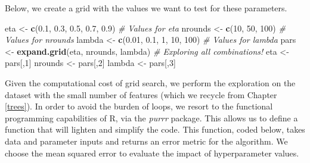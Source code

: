 \documentclass[]{krantz}
\makeatletter
\newenvironment{Shaded}{\begin{snugshade}}{\end{snugshade}}
\newcommand{\CommentTok}[1]{\textcolor[rgb]{0.37,0.37,0.37}{\textit{#1}}}
\newcommand{\DecValTok}[1]{\textcolor[rgb]{0.06,0.06,0.06}{#1}}
\newcommand{\FloatTok}[1]{\textcolor[rgb]{0.06,0.06,0.06}{#1}}
\newcommand{\KeywordTok}[1]{\textcolor[rgb]{0.27,0.27,0.27}{\textbf{#1}}}
\newcommand{\NormalTok}[1]{#1}
\newcommand{\StringTok}[1]{\textcolor[rgb]{0.5,0.5,0.5}{#1}}
\newenvironment{kframe}{%
\medskip{}
\setlength{\fboxsep}{.8em}
 \def\at@end@of@kframe{}%
 \ifinner\ifhmode%
  \def\at@end@of@kframe{\end{minipage}}%
  \begin{minipage}{\columnwidth}%
 \fi\fi%
 \def\FrameCommand##1{\hskip\@totalleftmargin \hskip-\fboxsep
 \colorbox{shadecolor}{##1}\hskip-\fboxsep
     \hskip-\linewidth \hskip-\@totalleftmargin \hskip\columnwidth}%
 \MakeFramed {\advance\hsize-\width
   \@totalleftmargin\z@ \linewidth\hsize
   \@setminipage}}%
 {\par\unskip\endMakeFramed%
 \at@end@of@kframe}
\renewenvironment{Shaded}{\begin{kframe}}{\end{kframe}}
\theoremstyle{definition}
\theoremstyle{definition}
\theoremstyle{definition}
\theoremstyle{remark}
\makeatother
\begin{document}
Below, we create a grid with the values we want to test for these
parameters.

\footnotesize

\begin{Shaded}
\begin{Highlighting}[]
\NormalTok{eta <-}\StringTok{ }\KeywordTok{c}\NormalTok{(}\FloatTok{0.1}\NormalTok{, }\FloatTok{0.3}\NormalTok{, }\FloatTok{0.5}\NormalTok{, }\FloatTok{0.7}\NormalTok{, }\FloatTok{0.9}\NormalTok{)         }\CommentTok{# Values for eta}
\NormalTok{nrounds <-}\StringTok{ }\KeywordTok{c}\NormalTok{(}\DecValTok{10}\NormalTok{, }\DecValTok{50}\NormalTok{, }\DecValTok{100}\NormalTok{)                 }\CommentTok{# Values for nrounds}
\NormalTok{lambda <-}\StringTok{ }\KeywordTok{c}\NormalTok{(}\FloatTok{0.01}\NormalTok{, }\FloatTok{0.1}\NormalTok{, }\DecValTok{1}\NormalTok{, }\DecValTok{10}\NormalTok{, }\DecValTok{100}\NormalTok{)        }\CommentTok{# Values for lambda}
\NormalTok{pars <-}\StringTok{ }\KeywordTok{expand.grid}\NormalTok{(eta, nrounds, lambda) }\CommentTok{# Exploring all combinations!}
\NormalTok{eta <-}\StringTok{ }\NormalTok{pars[,}\DecValTok{1}\NormalTok{]}
\NormalTok{nrounds <-}\StringTok{ }\NormalTok{pars[,}\DecValTok{2}\NormalTok{]}
\NormalTok{lambda <-}\StringTok{ }\NormalTok{pars[,}\DecValTok{3}\NormalTok{]}
\end{Highlighting}
\end{Shaded}

\normalsize

Given the computational cost of grid search, we perform the exploration
on the dataset with the small number of features (which we recycle from
Chapter \ref{trees}). In order to avoid the burden of loops, we resort
to the functional programming capabilities of R, via the \emph{purrr}
package. This allows us to define a function that will lighten and
simplify the code. This function, coded below, takes data and parameter
inputs and returns an error metric for the algorithm. We choose the mean
squared error to evaluate the impact of hyperparameter values.

\footnotesize
\end{document}
